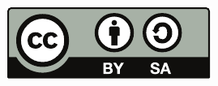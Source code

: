 \documentclass{beamer}
\begin{document}
\begin{frame}
\begin{center}
    \href{http://creativecommons.org/licenses/by-sa/2.0/fr/}{\includegraphics[width=.40\linewidth]{images/cc_by_sa}}
\end{center}
\end{frame}
\end{document}
